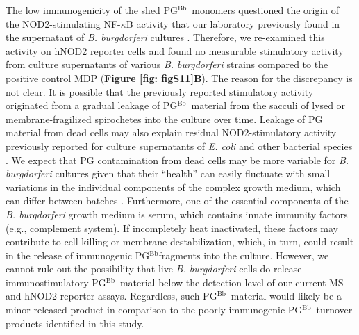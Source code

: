 \documentclass[twoside, watermark]{zHenriquesLab-StyleBioRxiv}
\newcommand{\pgbb}{PG$^\text{Bb}$}
\begin{document}
\vspace{1mm}
The low immunogenicity of the shed \pgbb~monomers questioned the origin of the NOD2-stimulating NF-$\kappa$B activity that our laboratory previously found in the supernatant of \textit{B. burgdorferi} cultures \cite{Jutras2019}. Therefore, we re-examined this activity on hNOD2 reporter cells and found no measurable stimulatory activity from culture supernatants of various \textit{B. burgdorferi} strains compared to the positive control MDP (\textbf{Figure \ref{fig: figS11}B}). The reason for the discrepancy is not clear. It is possible that the previously reported stimulatory activity originated from a gradual leakage of \pgbb~material from the sacculi of lysed or membrane-fragilized spirochetes into the culture over time. Leakage of PG material from dead cells may also explain residual NOD2-stimulatory activity previously reported for culture supernatants of \textit{E. coli} and other bacterial species \cite{Hasegawa2006}. We expect that PG contamination from dead cells may be more variable for \textit{B. burgdorferi} cultures given that their “health” can easily fluctuate with small variations in the individual components of the complex growth medium, which can differ between batches \cite{Callister1990,Wang2004,Yang2001}. Furthermore, one of the essential components of the \textit{B. burgdorferi} growth medium is serum, which contains innate immunity factors (e.g., complement system). If incompletely heat inactivated, these factors may contribute to cell killing or membrane destabilization, which, in turn, could result in the release of immunogenic \pgbb fragments into the culture. However, we cannot rule out the possibility that live \textit{B. burgdorferi} cells do release immunostimulatory \pgbb~material below the detection level of our current MS and hNOD2 reporter assays. Regardless, such \pgbb~material would likely be a minor released product in comparison to the poorly immunogenic \pgbb~turnover products identified in this study.
\end{document}
